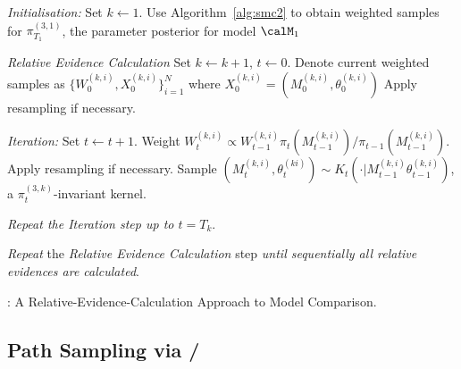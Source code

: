 \begin{algorithm}
\begin{algorithmic}
  \tophrule
  \STATE \emph{Initialisation:} Set $k\leftarrow1$.
  \STATE\STATESKIP Use Algorithm~\ref{alg:smc2} to obtain weighted samples
  for $\pi_{T_1}^{(3,1)}$, the parameter posterior for model $\Mk[1]$

  \STATE \emph{Relative Evidence Calculation}
  \STATE\STATESKIP Set $k\leftarrow k + 1$, $t\leftarrow0$.
  \STATE\STATESKIP Denote current weighted samples as
  $\{W_0^{(k,i)},X_0^{(k,i)}\}_{i=1}^N$ where $X_0^{(k,i)} =
  (M_0^{(k,i)},\theta_0^{(k,i)})$
  \STATE\STATESKIP Apply resampling if necessary.

  \STATE\STATESKIP \emph{Iteration:} Set $t\leftarrow t + 1$.
  \STATE\STATESKIP\STATESKIP Weight $W_t^{(k,i)} \propto W_{t-1}^{(k,i)}
  {\pi_t(M_{t-1}^{(k,i)})}/{\pi_{t-1}(M_{t-1}^{(k,i)})}$.
  \STATE\STATESKIP\STATESKIP Apply resampling if necessary.
  \STATE\STATESKIP\STATESKIP Sample $(M_t^{(k,i)},\theta_t^{(ki)}) \sim
  K_t(\cdot|M_{t-1}^{(k,i)}\theta_{t-1}^{(k,i)})$, a $\pi_t^{(3,k)}$-invariant
  kernel.

  \STATE\STATESKIP \emph{Repeat the \emph{Iteration} step up to $t = T_k$}.

  \STATE \emph{Repeat} the \emph{Relative Evidence Calculation} step \emph{until
    sequentially all relative evidences are calculated}.
  \bottomhrule
\end{algorithmic}
\caption{\smc[3]: A Relative-Evidence-Calculation Approach to Model Comparison.}
\label{alg:smc3}
\end{algorithm}

\subsection{Path Sampling via \smc[2]/\smc[3]}
\label{sub:Path Sampling via smc2/smc3}

